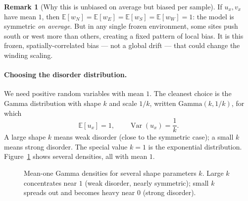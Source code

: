 \documentclass[11pt]{article}
\theoremstyle{definition}
\newtheorem{remark}{Remark}[section]
\theoremstyle{plain}
\newcommand{\E}{\mathbb{E}}
\newcommand{\Var}{\operatorname{Var}}
\begin{document}
\begin{remark}[Why this is unbiased on average but biased per sample]
If $u_x,v_x$ have mean $1$, then $\E[w_N]=\E[w_E]=\E[w_S]=\E[w_W]=1$: the model
is symmetric \emph{on average}. But in any single frozen environment, some sites
push south or west more than others, creating a fixed pattern of local bias. It
is this frozen, spatially-correlated bias --- not a global drift --- that could
change the winding scaling.
\end{remark}

\paragraph{Choosing the disorder distribution.}
We need positive random variables with mean $1$. The cleanest choice is the
Gamma distribution with shape $k$ and scale $1/k$, written
$\mathrm{Gamma}(k,1/k)$, for which
\[
   \E[u_x]=1,\qquad \Var(u_x)=\frac1k .
\]
A large shape $k$ means weak disorder (close to the symmetric case); a small $k$
means strong disorder. The special value $k=1$ is the exponential distribution.
Figure~\ref{fig:gamma} shows several densities, all with mean $1$.

\begin{figure}[h]
\centering
{}
\caption{Mean-one Gamma densities for several shape parameters $k$. Large $k$
concentrates near $1$ (weak disorder, nearly symmetric); small $k$ spreads out
and becomes heavy near $0$ (strong disorder).}
\label{fig:gamma}
\end{figure}
\end{document}
